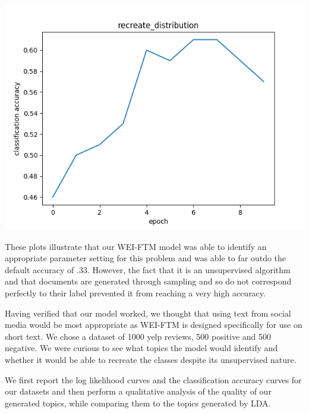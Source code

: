 \documentclass[letterpaper, 11pt]{article}
\begin{document}
\begin{multicols}{2}
\begin{center}
\includegraphics[scale=.3]{accuracy}
\end{center}

\noindent These plots illustrate that our WEI-FTM model was able to identify an appropriate
parameter setting for this problem and was able to far outdo the default accuracy of .33.
However, the fact that it is an unsupervised algorithm and that documents are generated through
sampling and so do not correspond perfectly to their label prevented it from reaching a very high
accuracy.

Having verified that our model worked, we thought that using text from social media would be most
appropriate as WEI-FTM is designed specifically for use on short text.
We chose a dataset of 1000 yelp reviews, 500 positive and 500 negative.
We were curious to see what topics the model would identify and whether it would be able to
recreate the classes despite its unsupervised nature.

We first report the log likelihood curves and the classification accuracy curves for our datasets
and then perform a qualitative analysis of the quality of our generated topics, while comparing
them to the topics generated by LDA.


\end{multicols}
\end{document}
